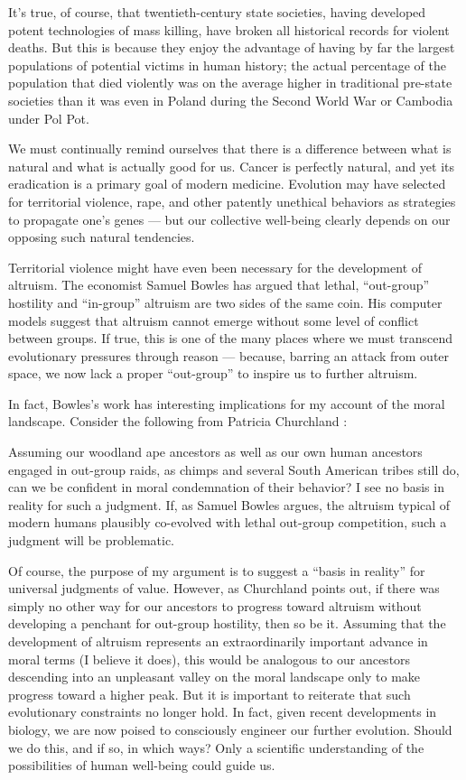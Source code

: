 \documentclass[a4paper,14pt]{extbook}
\begin{document}
It’s true, of course, that twentieth-century state societies, having developed potent technologies of mass killing, have broken all historical records for violent deaths.
But this is because they enjoy the advantage of having by far the largest populations of potential victims in human history;
the actual percentage of the population that died violently was on the average higher in traditional pre-state societies than it was even in Poland during the Second World War or Cambodia under Pol Pot.

We must continually remind ourselves that there is a difference between what is natural and what is actually good for us.
Cancer is perfectly natural, and yet its eradication is a primary goal of modern medicine.
Evolution may have selected for territorial violence, rape, and other patently unethical behaviors as strategies to propagate one’s genes --- but our collective well-being clearly depends on our opposing such natural tendencies.

Territorial violence might have even been necessary for the development of altruism.
The economist Samuel Bowles has argued that lethal, ``out-group'' hostility and ``in-group'' altruism are two sides of the same coin.
His computer models suggest that altruism cannot emerge without some level of conflict between groups.
If true, this is one of the many places where we must transcend evolutionary pressures through reason --- because, barring an attack from outer space, we now lack a proper ``out-group'' to inspire us to further altruism.

In fact, Bowles’s work has interesting implications for my account of the moral landscape.
Consider the following from Patricia Churchland :

Assuming our woodland ape ancestors as well as our own human ancestors engaged in out-group raids, as chimps and several South American tribes still do, can we be confident in moral condemnation of their behavior?
I see no basis in reality for such a judgment.
If, as Samuel Bowles argues, the altruism typical of modern humans plausibly co-evolved with lethal out-group competition, such a judgment will be problematic.

Of course, the purpose of my argument is to suggest a ``basis in reality'' for universal judgments of value.
However, as Churchland points out, if there was simply no other way for our ancestors to progress toward altruism without developing a penchant for out-group hostility, then so be it.
Assuming that the development of altruism represents an extraordinarily important advance in moral terms (I believe it does), this would be analogous to our ancestors descending into an unpleasant valley on the moral landscape only to make progress toward a higher peak.
But it is important to reiterate that such evolutionary constraints no longer hold.
In fact, given recent developments in biology, we are now poised to consciously engineer our further evolution.
Should we do this, and if so, in which ways?
Only a scientific understanding of the possibilities of human well-being could guide us.
\end{document}
